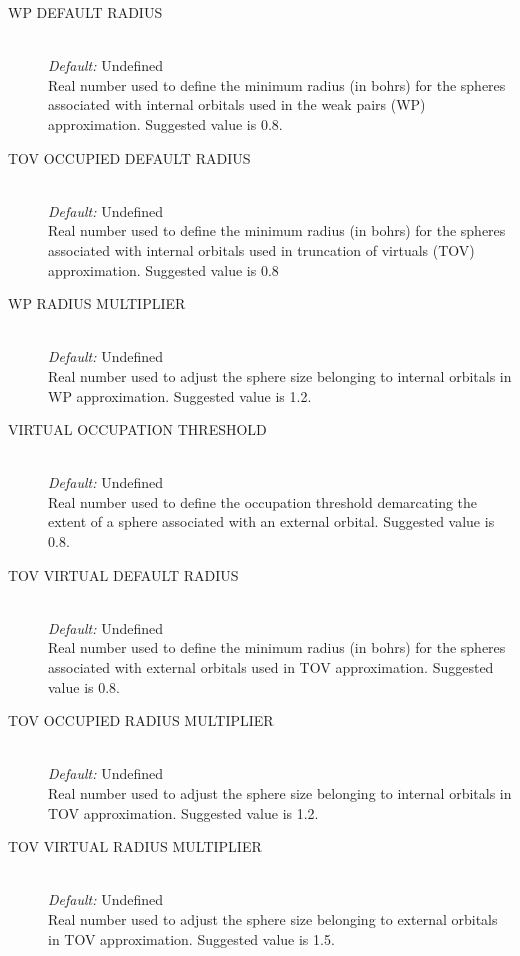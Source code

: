 \documentclass{article}
\begin{document}
\begin{description}
        \item[WP DEFAULT RADIUS ] \hfill \\
        \emph{Default:} Undefined \hfill \\
        Real number used to define the minimum radius (in bohrs) for the spheres associated with internal orbitals used in the weak pairs (WP) approximation. Suggested value is 0.8.
        
        \item[TOV OCCUPIED DEFAULT RADIUS] \hfill \\
        \emph{Default:} Undefined \hfill \\
        Real number used to define the minimum radius (in bohrs) for the spheres associated with internal orbitals used in truncation of virtuals (TOV) approximation. Suggested value is 0.8 
        
        \item[WP RADIUS MULTIPLIER] \hfill \\
        \emph{Default:} Undefined \hfill \\
        Real number used to adjust the sphere size belonging to internal orbitals in WP approximation. Suggested value is 1.2. 
        
        \item[VIRTUAL OCCUPATION THRESHOLD] \hfill \\
        \emph{Default:} Undefined \hfill \\
        Real number used to define the occupation threshold demarcating the extent of a sphere associated with an external orbital. Suggested value is 0.8.
        
        \item[TOV VIRTUAL DEFAULT RADIUS ] \hfill \\
        \emph{Default:} Undefined \hfill \\
        Real number used to define the minimum radius (in bohrs) for the spheres associated with external orbitals used in TOV approximation. Suggested value is 0.8.
        
        \item[TOV OCCUPIED RADIUS MULTIPLIER ] \hfill \\
        \emph{Default:} Undefined \hfill \\
        Real number used to adjust the sphere size belonging to internal orbitals in TOV approximation. Suggested value is 1.2.
        
        \item[TOV VIRTUAL RADIUS MULTIPLIER ] \hfill \\
        \emph{Default:} Undefined \hfill \\
        Real number used to adjust the sphere size belonging to external orbitals in TOV approximation. Suggested value is 1.5. 
        

\end{description}
\end{document}
